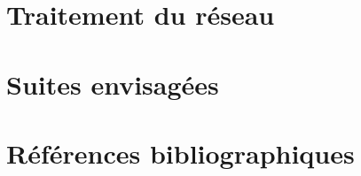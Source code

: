\documentclass{article}           %
\begin{document}
    
    

\section{Traitement du r\'eseau}

\section{Suites envisag\'ees}

\section{R\'ef\'erences bibliographiques}

\nocite{*}
\printbibliography{}



\appendix

\printindex
\end{document}
